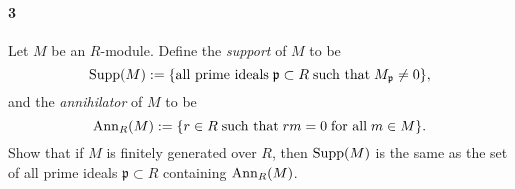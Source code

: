 \documentclass[12pt]{article}
\newlength{\myparskip}
\newenvironment{fullbox}{\begin{lrbox}{\savefullbox}\begin{minipage}{\dimexpr\textwidth-2\fboxsep\relax}\setlength{\parskip}{\myparskip}}{\end{minipage}\end{lrbox}\framebox[\textwidth]{\usebox{\savefullbox}}}
\newenvironment{pbox}[1][]{\begin{fullbox}\ifx#1\empty\else\paragraph{#1}\phantom{}\fi}{\end{fullbox}}
\theoremstyle{definition}
\newenvironment{cd}{\begin{center}\begin{tikzcd}}{\end{tikzcd}\end{center}}
\newcommand{\<}{\langle}
\renewcommand{\>}{\rangle}
\newcommand{\isom}{\cong}
\newcommand{\seq}{\subseteq}
\newcommand{\mm}{\mathfrak{m}}
\newcommand{\tensor}{\otimes}
\begin{document}



\newpage
\begin{pbox}[3]
    Let $M$ be an $R$-module. Define the \emph{support} of $M$ to be  
    \[
    {\rm Supp}(M):=\{\textrm{all prime ideals}\;\mathfrak{p}\subset R\;\textrm{such that}\;M_{\mathfrak{p}}\neq 0\},
    \]
    and the \emph{annihilator} of $M$ to be
    \[
    {\rm Ann}_R(M):=\{r\in R\;\textrm{such that}\;rm=0\;\textrm{for all}\;m\in M\}.
    \] 
    Show that if $M$ is finitely generated over $R$, then ${\rm Supp}(M)$ is the same as the set of all prime ideals $\mathfrak{p}\subset R$ containing  ${\rm Ann}_R(M)$.
\end{pbox}
\end{document}
